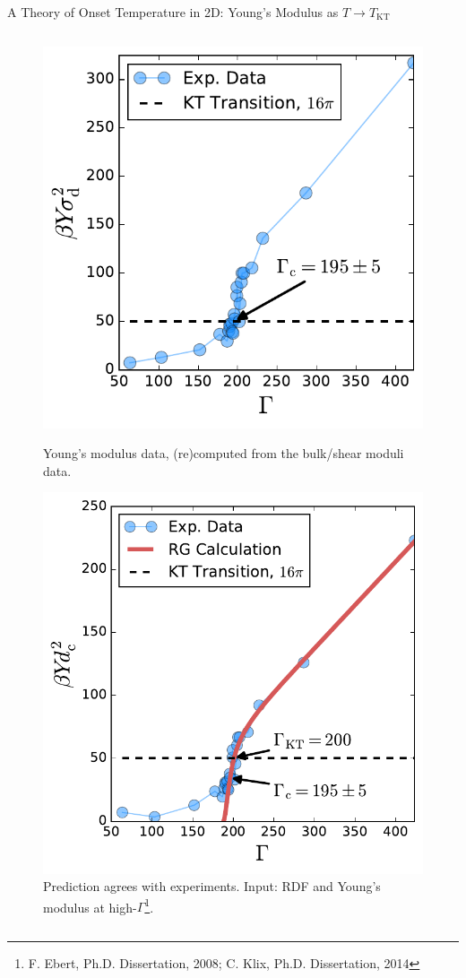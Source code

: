 \begin{frame}{A Theory of Onset Temperature in 2D: Young's Modulus as $T \to T_\mathrm{KT}$}
\begin{columns}
\begin{column}[T]{0.425\textwidth}
\begin{figure}
\begin{overprint}
    \centering\includegraphics[height=0.65\textheight]{c.13-kt_keim_1/YRG_keim_exp_1.pdf}\caption{Young's modulus data, (re)computed from the bulk/shear moduli data.}

\centering\includegraphics[height=0.65\textheight]{c.13-kt_keim_1/YRG_keim.pdf}\caption{Prediction agrees with experiments. Input: RDF and Young's modulus at high-$\Gamma$\vspace{-10pt}\footnote{ F. Ebert, Ph.D. Dissertation, 2008; C. Klix, Ph.D. Dissertation, 2014}.}


\end{overprint}
\end{figure}
\end{column}
\end{columns}
\end{frame}
